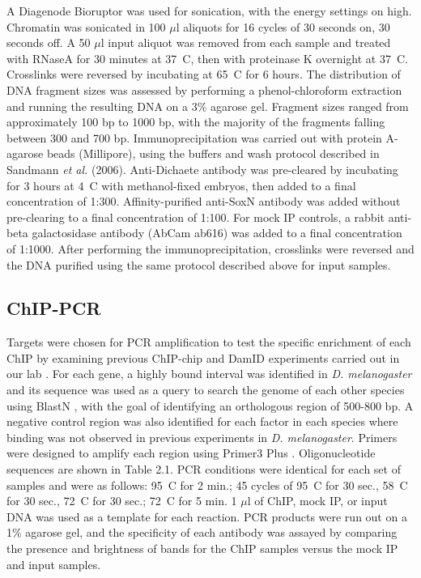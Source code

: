 A Diagenode Bioruptor was used for sonication, with the energy settings on high. Chromatin was sonicated in 100 \(\mu\)l aliquots for 16 cycles of 30 seconds on, 30 seconds off. A 50 \(\mu\)l input aliquot was removed from each sample and treated with RNaseA for 30 minutes at 37\degree~C, then with proteinase K overnight at 37\degree~C. Crosslinks were reversed by incubating at 65\degree~C for 6 hours. The distribution of DNA fragment sizes was assessed by performing a phenol-chloroform extraction and running the resulting DNA on a 3\% agarose gel. Fragment sizes ranged from approximately 100 bp to 1000 bp, with the majority of the fragments falling between 300 and 700 bp. Immunoprecipitation was carried out with protein A-agarose beads (Millipore), using the buffers and wash protocol described in Sandmann \emph{et al.} (2006). Anti-Dichaete antibody was pre-cleared by incubating for 3 hours at 4\degree~C with methanol-fixed embryos, then added to a final concentration of 1:300. Affinity-purified anti-SoxN antibody was added without pre-clearing to a final concentration of 1:100. For mock IP controls, a rabbit anti-beta galactosidase antibody (AbCam ab616) was added to a final concentration of 1:1000. After performing the immunoprecipitation, crosslinks were reversed and the DNA purified using the same protocol described above for input samples.

\subsection{ChIP-PCR}
Targets were chosen for PCR amplification to test the specific enrichment of each ChIP by examining previous ChIP-chip and DamID experiments carried out in our lab \citep{aleksic_role_2013,ferrero_soxneuro_2014}. For each gene, a highly bound interval was identified in \emph{D. melanogaster} and its sequence was used as a query to search the genome of each other species using BlastN \citep{altschul_basic_1990}, with the goal of identifying an orthologous region of 500-800 bp. A negative control region was also identified for each factor in each species where binding was not observed in previous experiments in \emph{D. melanogaster}. Primers were designed to amplify each region using Primer3 Plus \citep{untergasser_primer3plus_2007}. Oligonucleotide sequences are shown in Table 2.1. PCR conditions were identical for each set of samples and were as follows: 95\degree~C for 2 min.; 45 cycles of 95\degree~C for 30 sec., 58\degree~C for 30 sec., 72\degree~C for 30 sec.; 72\degree~C for 5 min. 1 \(\mu\)l of ChIP, mock IP, or input DNA was used as a template for each reaction. PCR products were run out on a 1\% agarose gel, and the specificity of each antibody was assayed by comparing the presence and brightness of bands for the ChIP samples versus the mock IP and input samples.

